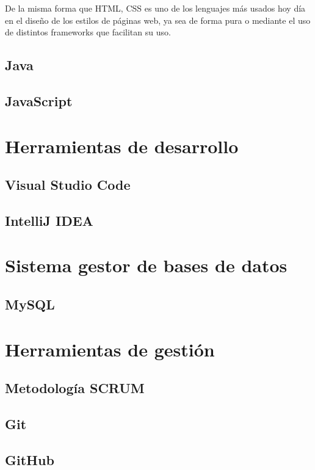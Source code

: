 De la misma forma que HTML, CSS es uno de los lenguajes más usados hoy día en el diseño de los estilos de páginas web, ya sea de forma pura o mediante el uso de distintos frameworks que facilitan su uso.


\subsection{Java}


\subsection{JavaScript}


\section{Herramientas de desarrollo}


\subsection{Visual Studio Code}


\subsection{IntelliJ IDEA}


\section{Sistema gestor de bases de datos}


\subsection{MySQL}


\section{Herramientas de gestión}


\subsection{Metodología SCRUM}


\subsection{Git}


\subsection{GitHub}


